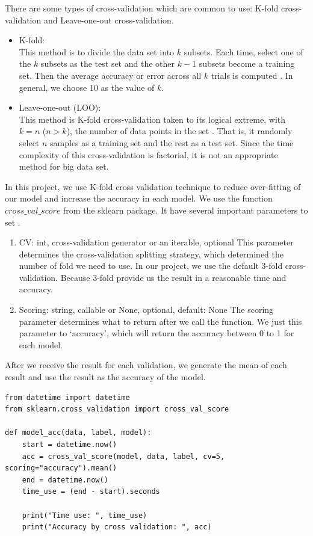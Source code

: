 \documentclass[sigconf]{acmart}
\begin{document}
There are some types of cross-validation which are common to use: K-fold cross-validation and Leave-one-out cross-validation.
\begin{itemize}
    \item K-fold: \\
    This method is to divide the data set into $k$ subsets. Each time, select one of the $k$ subsets as the test set and the other $k-1$ subsets become a training set. Then the average accuracy or error across all $k$ trials is computed \cite{10f.cv}. In general, we choose 10 as the value of $k$. 
    \item Leave-one-out (LOO): \\
    This method is K-fold cross-validation taken to its logical extreme, with $k=n$ ($n>k$), the number of data points in the set \cite{10f.cv}. That is, it randomly select $n$ samples as a training set and the rest as a test set. Since the time complexity of this cross-validation is factorial, it is not an appropriate method for big data set.
\end{itemize}

In this project, we use K-fold cross validation technique to reduce over-fitting of our model and increase the accuracy in each model. We use the function $cross\_val\_score$ from the sklearn package. It have several important parameters to set \cite{sklearn.cv}.

\begin{enumerate}
    \item CV: int, cross-validation generator or an iterable, optional
    This parameter determines the cross-validation splitting strategy, which determined the number of fold we need to use. In our project, we use the default 3-fold cross-validation. Because 3-fold provide us the result in a reasonable time and accuracy.
    \item Scoring: string, callable or None, optional, default: None
    The scoring parameter determines what to return after we call the function. We just this parameter to `accuracy', which will return the accuracy between 0 to 1 for each model.
\end{enumerate}

After we receive the result for each validation, we generate the mean of each result and use the result as the accuracy of the model.

\begin{lstlisting}
from datetime import datetime
from sklearn.cross_validation import cross_val_score

def model_acc(data, label, model):
    start = datetime.now()
    acc = cross_val_score(model, data, label, cv=5, scoring="accuracy").mean()
    end = datetime.now()
    time_use = (end - start).seconds
    
    print("Time use: ", time_use)
    print("Accuracy by cross validation: ", acc)
\end{lstlisting}
\end{document}
